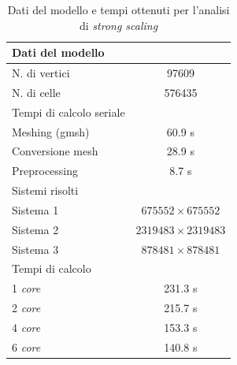 \begin{table}[p]
\centering
\begin{minipage}{0.45\textwidth}
\centering
\tiny
{}
\label{fig:strongscaling}
\end{minipage}
\begin{minipage}{0.45\textwidth}
\centering
\tiny
\caption{Dati del modello e tempi ottenuti per l'analisi di \textit{strong scaling}}
\label{tab:strongscaling}
\begin{tabular}{lc}
\toprule
Dati del modello&\\
\midrule
N. di vertici & 97609\\
N. di celle & 576435\\
\midrule
Tempi di calcolo seriale\\
\midrule
Meshing (gmsh) & 60.9 s\\
Conversione mesh & 28.9 s\\
Preprocessing & 8.7 s\\
\midrule
Sistemi risolti&\\
Sistema 1 & $675552\times675552$\\
Sistema 2 & $2319483\times2319483$\\
Sistema 3 & $878481\times878481$\\
\midrule
Tempi di calcolo\\
\midrule
1 \textit{core} & 231.3 s\\
2 \textit{core} & 215.7 s\\
4 \textit{core} & 153.3 s\\
6 \textit{core} & 140.8 s\\
\bottomrule
\end{tabular}
\end{minipage}
\end{table}


